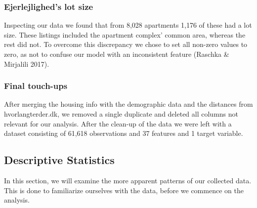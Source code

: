 \documentclass[12pt,a4paper]{article}
\begin{document}
\subsubsection{Ejerlejlighed's lot size}
Inspecting our data we found that from 8,028 apartments 1,176 of these had a lot size. These listings included the apartment complex' common area, whereas the rest did not. To overcome this discrepancy we chose to set all non-zero values to zero, as not to confuse our model with an inconsistent feature (Raschka \& Mirjalili 2017).

\subsubsection{Final touch-ups}
After merging the housing info with the demographic data and the distances from hvorlangterder.dk, we removed a single duplicate and deleted all columns not relevant for our analysis. After the clean-up of the data we were left with a dataset consisting of 61,618  observations and 37 features and 1 target variable. 

\subsection{Descriptive Statistics}
In this section, we will examine the more apparent patterns of our collected data. This is done to familiarize ourselves with the data, before we commence on the analysis.
\end{document}

